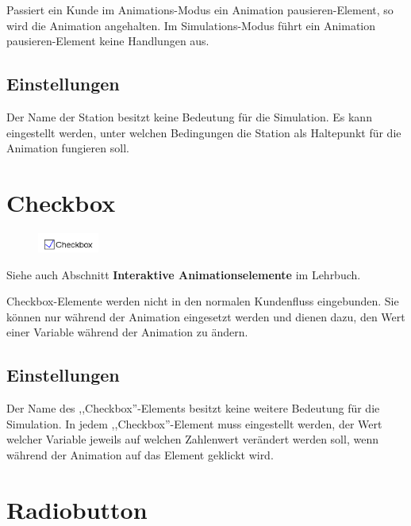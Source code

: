 Passiert ein Kunde im Animations-Modus ein Animation pausieren-Element, so wird die Animation angehalten.
Im Simulations-Modus führt ein Animation pausieren-Element keine Handlungen aus.

\subsection*{Einstellungen}

Der Name der Station besitzt keine Bedeutung für die Simulation.
Es kann eingestellt werden, unter welchen Bedingungen die Station als Haltepunkt
für die Animation fungieren soll.


\section{Checkbox}
\label{ref:ModelElementInteractiveCheckbox}

\begin{figure}
\vspace{-22pt}
\includegraphics[width=2cm]{imageModelElementInteractiveCheckbox.png}
\vspace{-22pt}
\end{figure}

Siehe auch Abschnitt \textbf{Interaktive Animationselemente} im Lehrbuch.

Checkbox-Elemente werden nicht in den normalen Kundenfluss eingebunden.
Sie können nur während der Animation eingesetzt werden und dienen dazu,
den Wert einer Variable während der Animation zu ändern.

\subsection*{Einstellungen}

Der Name des ,,Checkbox''-Elements besitzt keine weitere Bedeutung für die Simulation.
In jedem ,,Checkbox''-Element muss eingestellt werden, der Wert welcher Variable
jeweils auf welchen Zahlenwert verändert werden soll, wenn während der Animation
auf das Element geklickt wird.


\section{Radiobutton}
\label{ref:ModelElementInteractiveRadiobutton}

